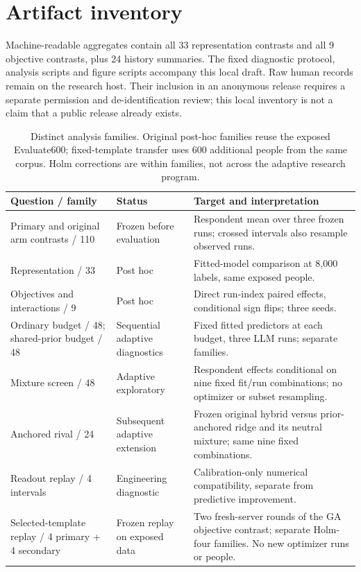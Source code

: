 \documentclass[sigconf,anonymous]{aamas}
\begin{document}
\section{Artifact inventory}
Machine-readable aggregates contain all 33 representation contrasts and all 9
objective contrasts, plus 24 history summaries. The fixed diagnostic protocol,
analysis scripts and figure scripts accompany this local draft. Raw human
records remain on the research host. Their inclusion in an anonymous release
requires a separate permission and de-identification review; this local
inventory is not a claim that a public release already exists.
\begin{table}[t]\centering\small
\caption{Distinct analysis families. Original post-hoc families reuse the
exposed Evaluate600; fixed-template transfer uses 600 additional people from
the same corpus. Holm corrections are within families, not across the adaptive
research program.}\label{tab:evidence-map}
\begin{tabular}{@{}p{}p{}p{}@{}}\toprule
Question / family & Status & Target and interpretation\\\midrule
Primary and original arm contrasts / 110 & Frozen before evaluation & Respondent mean over three frozen runs; crossed intervals also resample observed runs.\\
Representation / 33 & Post hoc & Fitted-model comparison at 8,000 labels, same exposed people.\\
Objectives and interactions / 9 & Post hoc & Direct run-index paired effects, conditional sign flips; three seeds.\\
Ordinary budget / 48; shared-prior budget / 48 & Sequential adaptive diagnostics & Fixed fitted predictors at each budget, three LLM runs; separate families.\\
Mixture screen / 48 & Adaptive exploratory & Respondent effects conditional on nine fixed fit/run combinations; no optimizer or subset resampling.\\
Anchored rival / 24 & Subsequent adaptive extension & Frozen original hybrid versus prior-anchored ridge and its neutral mixture; same nine fixed combinations.\\
Readout replay / 4 intervals & Engineering diagnostic & Calibration-only numerical compatibility, separate from predictive improvement.\\
Selected-template replay / 4 primary + 4 secondary & Frozen replay on exposed data & Two fresh-server rounds of the GA objective contrast; separate Holm-four families. No new optimizer runs or people.\\

\end{tabular}
\end{table}
\end{document}
